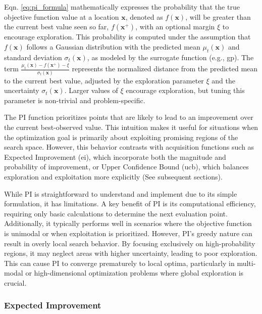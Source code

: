 Eqn. \eqref{eq:pi_formula} mathematically expresses the probability that the true objective function value at a location \(\mathbf{x}\), denoted as \(f(\mathbf{x})\), will be greater than the current best value seen so far, \(f(\mathbf{x}^+)\), with an optional margin \(\xi\) to encourage exploration. This probability is computed under the assumption that \(f(\mathbf{x})\) follows a Gaussian distribution with the predicted mean \(\mu_t(\mathbf{x})\) and standard deviation \(\sigma_t(\mathbf{x})\), as modeled by the surrogate function (e.g., \ac{gp}). The term \(\frac{\mu_t(\mathbf{x}) - f(\mathbf{x}^+) - \xi}{\sigma_t(\mathbf{x})}\) represents the normalized distance from the predicted mean to the current best value, adjusted by the exploration parameter \(\xi\) and the uncertainty \(\sigma_t(\mathbf{x})\). Larger values of \(\xi\) encourage exploration, but tuning this parameter is non-trivial and problem-specific.

The \ac{PI} function prioritizes points that are likely to lead to an improvement over the current best-observed value. This intuition makes it useful for situations when the optimization goal is primarily about exploiting promising regions of the search space. However, this behavior contrasts with acquisition functions such as Expected Improvement (\ac{ei}), which incorporate both the magnitude and probability of improvement, or Upper Confidence Bound (\ac{ucb}), which balances exploration and exploitation more explicitly (See subsequent sections).

While \ac{PI} is straightforward to understand and implement due to its simple formulation, it has limitations. A key benefit of PI is its computational efficiency, requiring only basic calculations to determine the next evaluation point. Additionally, it typically performs well in scenarios where the objective function is unimodal or when exploitation is prioritized. However, \ac{PI}'s greedy nature can result in overly local search behavior. By focusing exclusively on high-probability regions, it may neglect areas with higher uncertainty, leading to poor exploration. This can cause \ac{PI} to converge prematurely to local optima, particularly in multi-modal or high-dimensional optimization problems where global exploration is crucial.
 

\subsubsection{Expected Improvement}
\label{section:ei}

